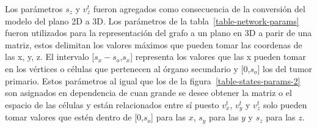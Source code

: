 \documentclass[12pt]{amsart}
\begin{document}


Los par\'ametros $s_z$ y $v_z^t$ fueron agregados como consecuencia de la conversi\'on del modelo del plano 2D a 3D. Los par\'ametros de la tabla~\ref{table-network-params} fueron utilizados para la representaci\'on del grafo a un plano en 3D a parir de una matriz, estos delimitan los valores m\'aximos que pueden tomar las coordenas de las x, y, z. El intervalo [$s_x - s_o$,$s_x$] representa los valores que las x pueden tomar en los v\'ertices o c\'elulas que pertenecen al \'organo secundario y [0,$s_o$] los del tumor primario. Estos par\'ametros al igual que los de la figura~\ref{table-states-params-2} son asignados en dependencia de cuan grande se desee obtener la matriz o el espacio de las c\'elulas y est\'an relacionados entre s\'i puesto $v_x^t$, $v_y^t$ y $v_z^t$ solo pueden tomar valores que est\'en dentro de [0,$s_o$] para las $x$, $s_y$ para las $y$ y $s_z$ para las $z$.
\end{document}
